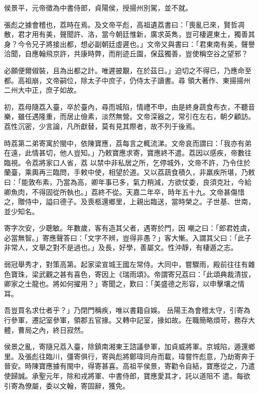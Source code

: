 \begin{pinyinscope}
 侯景平，元帝徵為中書侍郎，貞陽侯，授揚州別駕，並不就。



 張彪之據會稽也，荔時在焉。及文帝平彪，高祖遺荔書曰：「喪亂已來，賢哲凋散，君才用有美，聲聞許、洛，當今朝廷惟新，廣求英雋，豈可棲遲東土，獨善其身？今令兄子將接出都，想必副朝廷虛遲也。」文帝又與書曰：「君東南有美，聲譽洽聞，自應翰飛京許，共康時弊，而削迹丘園，保茲獨善，豈使稱空谷之望邪？



 必願便爾俶裝，且為出都之計。唯遲披覯，在於茲日。」迫切之不得已，乃應命至都。高祖崩，文帝嗣位，除太子中庶子，仍侍太子讀書。尋
 領大著作、東揚揚州二州大中正，庶子如故。



 初，荔母隨荔入臺，卒於臺內，尋而城陷，情禮不申，由是終身蔬食布衣，不聽音樂，雖任遇隆重，而居止儉素，淡然無營。文帝深器之，常引在左右，朝夕顧訪。荔性沉密，少言論，凡所獻替，莫有見其際者，故不列于後焉。



 時荔第二弟寄寓於閩中，依陳寶應，荔每言之輒流涕。文帝哀而謂曰：「我亦有弟在遠，此情甚切，他人豈知。」乃敕寶應求寄，寶應終不遣。荔因以感疾，帝數往臨視。令荔將家口人省，荔
 以禁中非私居之所，乞停城外，文帝不許，乃令住於蘭臺，乘輿再三臨問，手敕中使，相望於道。又以荔蔬食積久，非羸疾所堪，乃敕曰：「能敦布素，乃當為高，卿年事已多，氣力稍減，方欲仗委，良須克壯，今給卿魚肉，不得固從所執也。」荔終不從。天嘉二年卒，時年五十九。文帝甚傷惜之，贈侍中，謚曰德子。及喪柩還鄉里，上親出臨送，當時榮之。子世基、世南，並少知名。



 寄字次安，少聰敏。年數歲，客有造其父者，遇寄於門，因
 嘲之曰：「郎君姓虞，必當無智。」寄應聲答曰：「文字不辨，豈得非愚？」客大慚。入謂其父曰：「此子非常人，文舉之對不是過也。」及長，好學，善屬文。性沖靜，有棲遁之志。



 弱冠舉秀才，對策高第。起家梁宣城王國左常侍。大同中，嘗驟雨，殿前往往有雜色寶珠，梁武觀之甚有喜色，寄因上《瑞雨頌》。帝謂寄兄荔曰：「此頌典裁清拔，卿家之士龍也。將如何擢用？」寄聞之，歎曰：「美盛德之形容，以申擊壤之情耳。



 吾豈買名求仕者乎？」乃閉門稱疾，唯以書籍自娛。
 岳陽王為會稽太守，引寄為行參軍，遷記室參軍，領郡五官掾。又轉中記室，掾如故。在職簡略煩苛，務存大體，曹局之內，終日寂然。



 侯景之亂，寄隨兄荔入臺，除鎮南湘東王諮議參軍，加貞威將軍。京城陷，遁還鄉里。及張彪往臨川，彊寄俱行，寄與彪將鄭瑋同舟而載，瑋嘗忤彪意，乃劫寄奔于晉安。時陳寶應據有閩中，得寄甚喜。高祖平侯景，寄勸令自結，寶應從之，乃遣使歸誠。承聖元年，除和戎將軍、中書侍郎，寶應愛其才，託以道阻不
 遣。每欲引寄為僚屬，委以文翰，寄固辭，獲免。




\end{pinyinscope}
